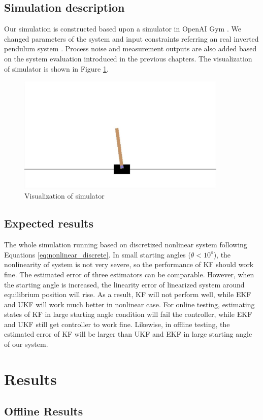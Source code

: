 \documentclass{article}
\begin{document}
\subsection{Simulation description}
Our simulation is constructed based upon a simulator in OpenAI Gym \cite{OpenAI}. We changed parameters of the system and input constraints referring an real inverted pendulum system \cite{lab6}. Process noise and measurement outputs are also added based on the system evaluation introduced in the previous chapters. The visualization of simulator is shown in Figure \ref{fig:simulator}.
\begin{figure}
	\centering
	\includegraphics[width=10cm,keepaspectratio]{Simulator.jpg}
	\caption{Visualization of simulator}
	\label{fig:simulator}
\end{figure}
\subsection{Expected results}
The whole simulation running based on discretized nonlinear system following Equations \ref{eq:nonlinear_discrete}. In small starting angles ($\theta<10^o$), the nonlinearity of system is not very severe, so the performance of KF should work fine. The estimated error of three estimators can be comparable. However, when the starting angle is increased, the linearity error of linearized system around equilibrium position will rise. As a result, KF will not perform well, while EKF and UKF will work much better in nonlinear case. For online testing, estimating states of KF in large starting angle condition will fail the controller, while EKF and UKF still get controller to work fine. Likewise, in offline testing, the estimated error of KF will be larger than UKF and EKF in large starting angle of our system.
\section{Results}
\subsection{Offline Results}
\end{document}
